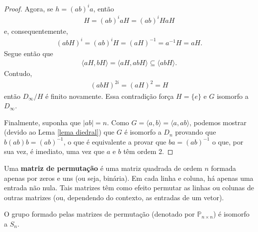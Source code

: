 \begin{proof}
		\par\vspace{0.3cm} Agora, se $h = (ab)^ia$, então
		\begin{align*}
		    H = (ab)^iaH = (ab)^iHaH
		\end{align*}
		e, consequentemente, 
		\begin{align*}
		    (abH)^i = (ab)^iH = (aH)^{-1} = a^{-1}H = aH.
		\end{align*}
		Segue então que
		\begin{align*}
		    \langle aH, bH \rangle = \langle aH, abH \rangle\subseteq \langle abH \rangle.
		\end{align*}
		Contudo, 
		\begin{align*}
		    (abH)^{2i} = (aH)^2 = H
		\end{align*}
		então $D_{\infty}/H$ é finito novamente. Essa contradição força 
		$H = \{e\}$ e $G$ isomorfo a $D_{\infty}$.
		
		\par\vspace{0.3cm} Finalmente, suponha que $|ab| = n$. Como $G = \langle a,b \rangle 
		= \langle a,ab \rangle$, podemos mostrar (devido ao Lema \ref{lema diedral}) que $G$ é isomorfo 
		a $D_n$ provando que $b(ab)b = (ab)^{-1}$, o que é equivalente a provar que $ba = (ab)^{-1}$ o que, 
		por sua vez, é imediato, uma vez que $a$ e $b$ têm ordem 2.
	\end{proof}
	\begin{definition}
		Uma \textbf{matriz de permutação} é uma matriz quadrada de ordem $n$ formada apenas por zeros 
		e uns (ou seja, binária). Em cada linha e coluna, há apenas uma entrada não nula. Tais matrizes 
		têm como efeito permutar as linhas ou colunas de outras matrizes (ou, dependendo do contexto, as 
		entradas de um vetor).
	\end{definition}
	\begin{lemma}
	\label{matrizes de permutacao}
		O grupo formado pelas matrizes de permutação (denotado por $\mathbb{P}_{n\times n}$) é isomorfo a $S_n$.
	\end{lemma}
